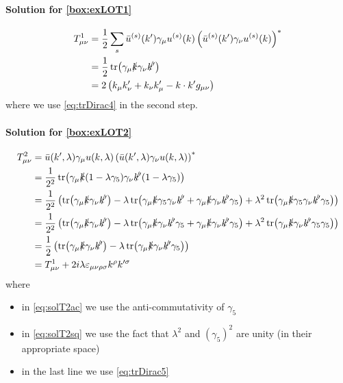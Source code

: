 \paragraph{Solution for \cref{box:exLOT1}}
\begin{align}
    T^1_{\mu\nu} &= \frac 1 2 \sum_{s} \bar u^{(s)}(k')\gamma_\mu u^{(s)}(k) \left(\bar u^{(s)}(k')\gamma_\nu u^{(s)}(k)\right)^*\\
        &= \frac 1 2 \tr(\gamma_\mu \slashed{k} \gamma_\nu \slashed{k'})\\
        &= 2\left(k_\mu k'_\nu + k_\nu k'_\mu - k \cdot k' g_{\mu\nu}\right)
\end{align}
where we use \cref{eq:trDirac4} in the second step.

\paragraph{Solution for \cref{box:exLOT2}}
\begin{align}
    T^2_{\mu\nu} &= \bar u(k',\lambda)\gamma_\mu u(k,\lambda) \left(\bar u(k',\lambda)\gamma_\nu u(k,\lambda)\right)^*\\
        &=\frac 1 {2^2} \tr(\gamma_\mu \slashed{k}(1-\lambda \gamma_5) \gamma_\nu \slashed{k'} (1-\lambda \gamma_5))\\
        &=\frac 1 {2^2} \left(\tr(\gamma_\mu \slashed{k}\gamma_\nu \slashed{k'}) - \lambda\tr(\gamma_\mu \slashed{k}\gamma_5 \gamma_\nu \slashed{k'} + \gamma_\mu \slashed{k}\gamma_\nu \slashed{k'} \gamma_5) + \lambda^2\tr(\gamma_\mu \slashed{k}\gamma_5 \gamma_\nu \slashed{k'} \gamma_5)\right)\\
        &=\frac 1 {2^2} \left(\tr(\gamma_\mu \slashed{k}\gamma_\nu \slashed{k'}) - \lambda\tr(\gamma_\mu \slashed{k}\gamma_\nu \slashed{k'}\gamma_5  + \gamma_\mu \slashed{k}\gamma_\nu \slashed{k'} \gamma_5) + \lambda^2\tr(\gamma_\mu \slashed{k}\gamma_\nu \slashed{k'} \gamma_5 \gamma_5)\right) \label{eq:solT2ac} \\
        &=\frac 1 {2} \left(\tr(\gamma_\mu \slashed{k}\gamma_\nu \slashed{k'}) - \lambda\tr(\gamma_\mu \slashed{k}\gamma_\nu \slashed{k'}\gamma_5 )\right) \label{eq:solT2sq}\\
        &= T^1_{\mu\nu} + 2 i \lambda \varepsilon_{\mu\nu\rho\sigma} k^\rho k'^\sigma
\end{align}
where
\begin{itemize}
    \item in \cref{eq:solT2ac} we use the anti-commutativity of $\gamma_5$
    \item in \cref{eq:solT2sq} we use the fact that $\lambda^2$ and $(\gamma_5)^2$ are unity (in their appropriate space)
    \item in the last line we use \cref{eq:trDirac5}
\end{itemize}

